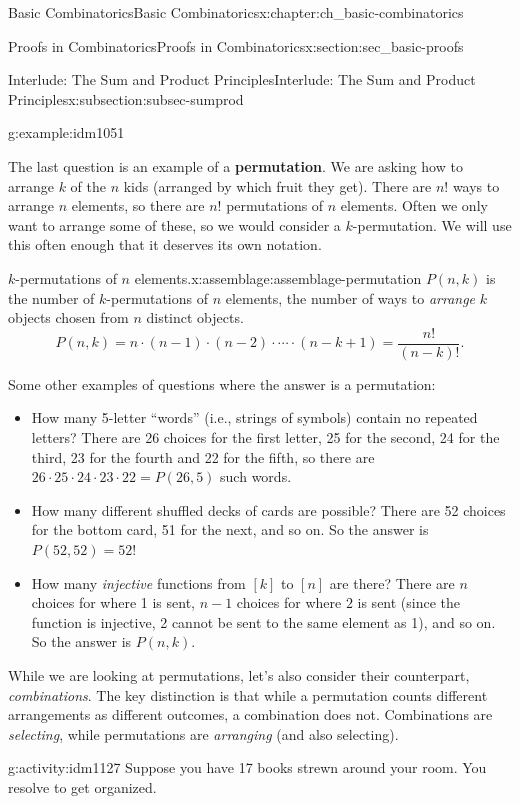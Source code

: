 \documentclass[oneside,10pt,]{book}
\newcommand{\terminology}[1]{\textbf{#1}}
\numberwithin{equation}{chapter}
\begin{document}
\begin{chapterptx}{Basic Combinatorics}{}{Basic Combinatorics}{}{}{x:chapter:ch_basic-combinatorics}
\begin{sectionptx}{Proofs in Combinatorics}{}{Proofs in Combinatorics}{}{}{x:section:sec_basic-proofs}
\begin{subsectionptx}{Interlude: The Sum and Product Principles}{}{Interlude: The Sum and Product Principles}{}{}{x:subsection:subsec-sumprod}
\begin{example}{}{g:example:idm1051}
\begin{enumerate}
\end{enumerate}
%
\end{example}
The last question is an example of a \terminology{permutation}.  We are asking how to arrange \(k\) of the \(n\) kids (arranged by which fruit they get).  There are \(n!\) ways to arrange \(n\) elements, so there are \(n!\) permutations of \(n\) elements.  Often we only want to arrange some of these, so we would consider a \(k\)-permutation.   We will use this often enough that it deserves its own notation.%
\begin{assemblage}{\(k\)-permutations of \(n\) elements.}{x:assemblage:assemblage-permutation}%
\(P(n,k)\) is the number of \(k\)-permutations of \(n\) elements, the number of ways to \emph{arrange} \(k\) objects chosen from \(n\) distinct objects.%
\begin{equation*}
P(n,k) = n\cdot (n-1) \cdot (n-2) \cdot \cdots \cdot (n-k+1) = \frac{n!}{(n-k)!}.
\end{equation*}
%
\end{assemblage}
Some other examples of questions where the answer is a permutation:%
\begin{itemize}[label=\textbullet]
\item{}How many 5-letter ``words'' (i.e., strings of symbols) contain no repeated letters?  There are 26 choices for the first letter, 25 for the second, 24 for the third, 23 for the fourth and 22 for the fifth, so there are \(26\cdot 25 \cdot 24 \cdot 23 \cdot 22 = P(26,5)\) such words.%
\item{}How many different shuffled decks of cards are possible?  There are 52 choices for the bottom card, 51 for the next, and so on.  So the answer is \(P(52,52) = 52!\)%
\item{}How many \emph{injective} functions from \([k]\) to \([n]\) are there?  There are \(n\) choices for where 1 is sent, \(n-1\) choices for where \(2\) is sent (since the function is injective, 2 cannot be sent to the same element as 1), and so on.  So the answer is \(P(n,k)\).%
\end{itemize}
%
\par
While we are looking at permutations, let's also consider their counterpart, \emph{combinations}. The key distinction is that while a permutation counts different arrangements as different outcomes, a combination does not.  Combinations are \emph{selecting}, while permutations are \emph{arranging} (and also selecting).%
\begin{activity}{}{g:activity:idm1127}%
Suppose you have 17 books strewn around your room.  You resolve to get organized.%

\end{activity}
\end{subsectionptx}
\end{sectionptx}
\end{chapterptx}
\end{document}
